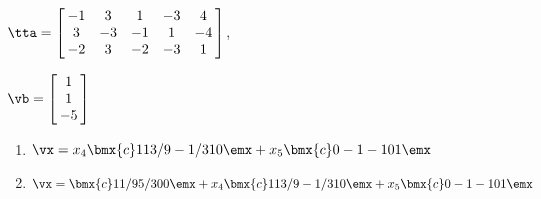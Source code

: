 {$\tta = \left[\hskip -3pt \begin{array}{ccccc} -1&3&1&-3&4\\  3&-3&-1&1
&-4\\  -2&3&-2&-3&1\end{array}\hskip -3pt \right] $, 

$\vb=\left[\hskip -3pt \begin{array}{c} 1\\  1\\  -5
\end{array}\hskip -3pt \right] $}
{\begin{enumerate}
\item	 $\vx=x_4\bmx{c}1\\ 13/9 \\-1/3 \\1\\0\emx+x_5\bmx{c} 0\\ -1 \\-1\\0\\1 \emx$

\item	$\vx=\bmx{c} 1\\ 1/9 \\ 5/3 \\ 0\\ 0  \emx + x_4\bmx{c}1\\ 13/9 \\ -1/3 \\1\\0\emx+x_5\bmx{c} 0\\ -1 \\-1\\0\\1 \emx$
\end{enumerate}}





